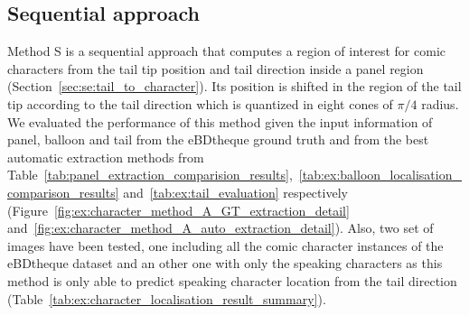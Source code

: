 
\subsection{Sequential approach} %

Method S is a sequential approach that computes a region of interest for comic characters from the tail tip position and tail direction inside a panel region (Section~\ref{sec:se:tail_to_character}).
Its position is shifted in the region of the tail tip according to the tail direction which is quantized in eight cones of $\pi/4$ radius.
We evaluated the performance of this method given the input information of panel, balloon and tail from the eBDtheque ground truth and from the best automatic extraction methods from Table~\ref{tab:panel_extraction_comparision_results},~\ref{tab:ex:balloon_localisation_comparison_results} and~\ref{tab:ex:tail_evaluation} respectively (Figure~\ref{fig:ex:character_method_A_GT_extraction_detail} and~\ref{fig:ex:character_method_A_auto_extraction_detail}).
Also, two set of images have been tested, one including all the comic character instances of the eBDtheque dataset and an other one with only the speaking characters as this method is only able to predict speaking character location from the tail direction (Table~\ref{tab:ex:character_localisation_result_summary}).

 





